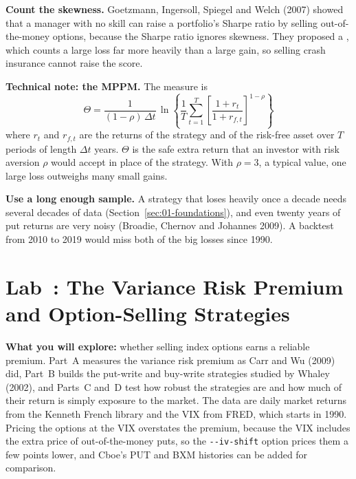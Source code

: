 \textbf{Count the skewness.} Goetzmann, Ingersoll, Spiegel and Welch (2007) showed that a manager with no skill can raise a portfolio's Sharpe ratio by selling out-of-the-money options, because the Sharpe ratio ignores skewness. They proposed a , which counts a large loss far more heavily than a large gain, so selling crash insurance cannot raise the score.

\begin{technote}
\textbf{Technical note: the MPPM.} The measure is
\begin{equation}
  \Theta = \frac{1}{(1 - \rho)\,\Delta t}\,\ln\!\left\{\frac{1}{T}\sum_{t=1}^{T}\left[\frac{1 + r_t}{1 + r_{f,t}}\right]^{1-\rho}\right\}
  \label{eq:16-mppm}
\end{equation}
where $r_t$ and $r_{f,t}$ are the returns of the strategy and of the risk-free asset over $T$ periods of length $\Delta t$ years. $\Theta$ is the safe extra return that an investor with risk aversion $\rho$ would accept in place of the strategy. With $\rho = 3$, a typical value, one large loss outweighs many small gains.
\end{technote}

\textbf{Use a long enough sample.} A strategy that loses heavily once a decade needs several decades of data (Section~\ref{sec:01-foundations}), and even twenty years of put returns are very noisy (Broadie, Chernov and Johannes 2009). A backtest from 2010 to 2019 would miss both of the big losses since 1990.


\section{Lab~\thechapter: The Variance Risk Premium and Option-Selling Strategies}
\label{sec:16-lab}

\textbf{What you will explore:} whether selling index options earns a reliable premium. Part~A measures the variance risk premium as Carr and Wu (2009) did, Part~B builds the put-write and buy-write strategies studied by Whaley (2002), and Parts~C and~D test how robust the strategies are and how much of their return is simply exposure to the market. The data are daily market returns from the Kenneth French library and the VIX from FRED, which starts in 1990. Pricing the options at the VIX overstates the premium, because the VIX includes the extra price of out-of-the-money puts, so the \texttt{-{}-iv-shift} option prices them a few points lower, and Cboe's PUT and BXM histories can be added for comparison.

